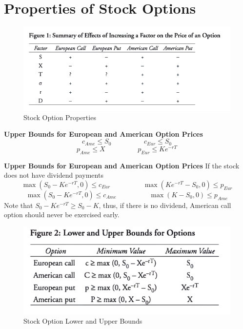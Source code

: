 \documentclass[11pt,fleqn]{book} %
\numberwithin{equation}{section} %
\numberwithin{figure}{section} %
\numberwithin{table}{section} %
\begin{document}
\chapter{Properties of Stock Options}
 \begin{center}
     \begin{figure}[h!]
         \centering
         \includegraphics[scale=0.7]{stockprop.PNG}
         \caption{Stock Option Properties}
     \end{figure}
 \end{center}
 \begin{theorem}\textbf{Upper Bounds for European and American Option Prices}
 $$
 c_{Ame}\leq S_0\hspace{2cm}c_{Eur}\leq S_0
 $$
 $$
 p_{Ame}\leq X\hspace{2cm}p_{Eur}\leq Ke^{-rT}
 $$
 \end{theorem}
 \begin{theorem}\textbf{Upper Bounds for European and American Option Prices}
 If the stock does not have dividend payments
 $$
 \max(S_0-Ke^{-rT},0)\leq c_{Eur}\hspace{2cm}\max(Ke^{-rT}-S_0,0)\leq p_{Eur}
 $$
 $$
 \max(S_0-Ke^{-rT},0)\leq c_{Ame}\hspace{2cm}\max(K-S_0,0)\leq p_{Ame}
 $$
 Note that $S_0-Ke^{-rT}\geq S_0-K$, thus, if there is no dividend, American call option should never be exercised early.
 \end{theorem}
 \begin{center}
     \begin{figure}[h!]
         \centering
         \includegraphics[scale=0.8]{uloption.PNG}
         \caption{Stock Option Lower and Upper Bounds}
     \end{figure}
 \end{center}
\end{document}
